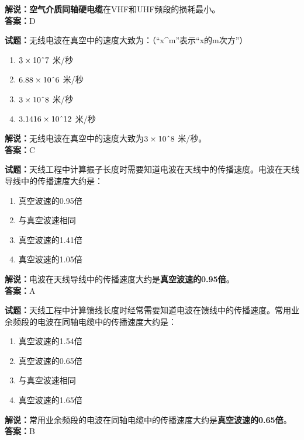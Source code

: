 \documentclass{ctexbook}
\begin{document}
\noindent\textbf{解说：}\textbf{空气介质同轴硬电缆}在VHF和UHF频段的损耗最小。\\\noindent\textbf{答案：}D


\bigskip


\noindent\textbf{试题：}无线电波在真空中的速度大致为：（“x\string^m”表示“x的m次方”）

\begin{enumerate}[leftmargin=3em]
	\item \(3\times10\string^7\) 米/秒
	\item \(6.88\times10\string^6\) 米/秒
	\item \(3\times10\string^8\) 米/秒
	\item \(3.1416\times10\string^12\) 米/秒
\end{enumerate}

\noindent\textbf{解说：}无线电波在真空中的速度大致为\(3\times10\string^8\) 米/秒。\\\noindent\textbf{答案：}C


\bigskip


\noindent\textbf{试题：}天线工程中计算振子长度时需要知道电波在天线中的传播速度。电波在天线导线中的传播速度大约是：

\begin{enumerate}[leftmargin=3em]
	\item 真空波速的0.95倍
	\item 与真空波速相同
	\item 真空波速的1.41倍
	\item 真空波速的1.05倍
\end{enumerate}

\noindent\textbf{解说：}电波在天线导线中的传播速度大约是\textbf{真空波速的0.95倍}。\\\noindent\textbf{答案：}A


\bigskip


\noindent\textbf{试题：}天线工程中计算馈线长度时经常需要知道电波在馈线中的传播速度。常用业余频段的电波在同轴电缆中的传播速度大约是：

\begin{enumerate}[leftmargin=3em]
	\item 真空波速的1.54倍
	\item 真空波速的0.65倍
	\item 与真空波速相同
	\item 真空波速的1.65倍
\end{enumerate}

\noindent\textbf{解说：}常用业余频段的电波在同轴电缆中的传播速度大约是\textbf{真空波速的0.65倍}。\\\noindent\textbf{答案：}B
\end{document}
